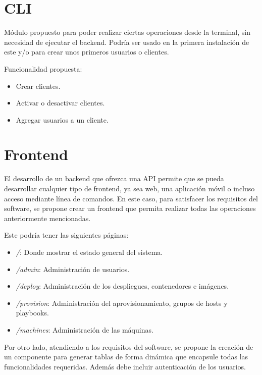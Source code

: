 \section{CLI}

Módulo propuesto para poder realizar ciertas operaciones desde la terminal, sin necesidad de ejecutar el backend. Podría ser usado en la primera instalación de este y/o para crear unos primeros usuarios o clientes.

\bigskip
Funcionalidad propuesta:
\begin{itemize}
	\item Crear clientes.
	\item Activar o desactivar clientes.
	\item Agregar usuarios a un cliente.
\end{itemize}




\section{Frontend}

El desarrollo de un backend que ofrezca una API permite que se pueda desarrollar cualquier tipo de frontend, ya sea web, una aplicación móvil o incluso acceso mediante línea de comandos. En este caso, para satisfacer los requisitos del software, se propone crear un frontend que permita realizar todas las operaciones anteriormente mencionadas.

\bigskip
Este podría tener las siguientes páginas:
\begin{itemize}
	\item \textit{/}: Donde mostrar el estado general del sistema.
	\item \textit{/admin}: Administración de usuarios.
	\item \textit{/deploy}: Administración de los despliegues, contenedores e imágenes.
	\item \textit{/provision}: Administración del aprovisionamiento, grupos de hosts y playbooks.
	\item \textit{/machines}: Administración de las máquinas.
\end{itemize}

\bigskip
Por otro lado, atendiendo a los requisitos del software, se propone la creación de un componente para generar tablas de forma dinámica que encapsule todas las funcionalidades requeridas. Además debe incluir autenticación de los usuarios.

